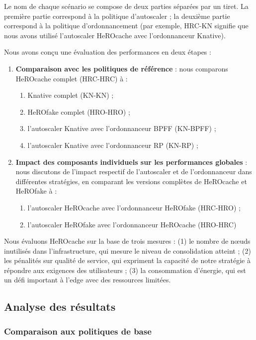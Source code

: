 {Le nom de chaque scénario se compose de deux parties séparées par un tiret. La première partie correspond à la politique d'autoscaler ; la deuxième partie correspond à la politique d'ordonnancement (par exemple, HRC-KN signifie que nous avons utilisé l'autoscaler HeROcache avec l'ordonnanceur Knative).

Nous avons conçu une évaluation des performances en deux étapes :

\begin{enumerate}
    \item \textbf{Comparaison avec les politiques de référence} : nous comparons HeROcache complet (HRC-HRC) à :
    \begin{enumerate}
        \item Knative complet (KN-KN) ;
        \item HeROfake complet (HRO-HRO) ;
        \item l'autoscaler Knative avec l'ordonnanceur BPFF (KN-BPFF) ;
        \item l'autoscaler Knative avec l'ordonnanceur RP (KN-RP) ;
    \end{enumerate}
    \item \textbf{Impact des composants individuels sur les performances globales} : nous discutons de l'impact respectif de l'autoscaler et de l'ordonnanceur dans différentes stratégies, en comparant les versions complètes de HeROcache et HeROfake à :
    \begin{enumerate}
        \item l'autoscaler HeROcache avec l'ordonnanceur HeROfake (HRC-HRO) ;
        \item l'autoscaler HeROfake avec l'ordonnanceur HeROcache (HRO-HRC)
    \end{enumerate}
\end{enumerate}

Nous évaluons HeROcache sur la base de trois mesures : (1) le nombre de nœuds inutilisés dans l'infrastructure, qui mesure le niveau de consolidation atteint ; (2) les pénalités sur qualité de service, qui expriment la capacité de notre stratégie à répondre aux exigences des utilisateurs ; (3) la consommation d'énergie, qui est un défi important à l'edge avec des ressources limitées.

\subsection{Analyse des résultats}

\subsubsection{Comparaison aux politiques de base}

}
